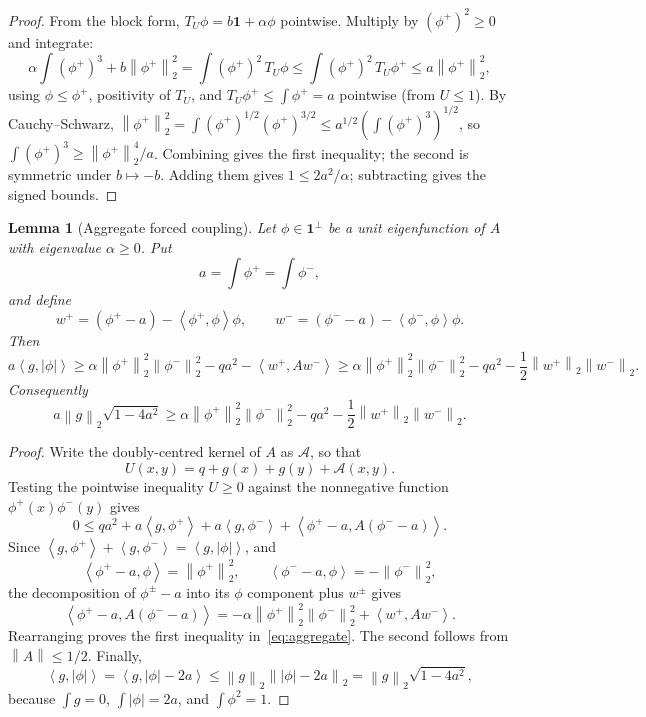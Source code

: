 \documentclass[11pt]{article}
\newtheorem{lemma}[theorem]{Lemma}
\newcommand{\one}{\mathbf 1}
\newcommand{\ip}[2]{\left\langle #1,#2\right\rangle}
\newcommand{\norm}[1]{\left\|#1\right\|}
\begin{document}
\begin{proof}
From the block form, $T_U\phi=b\one+\alpha\phi$ pointwise.  Multiply by
$(\phi^+)^2\ge0$ and integrate:
\[
        \alpha\int(\phi^+)^3+b\norm{\phi^+}_2^2
        =\int(\phi^+)^2\,T_U\phi
        \le\int(\phi^+)^2\,T_U\phi^+
        \le a\norm{\phi^+}_2^2,
\]
using $\phi\le\phi^+$, positivity of $T_U$, and $T_U\phi^+\le\int\phi^+=a$
pointwise (from $U\le1$).  By Cauchy--Schwarz,
$\norm{\phi^+}_2^2=\int(\phi^+)^{1/2}(\phi^+)^{3/2}
\le a^{1/2}(\int(\phi^+)^3)^{1/2}$, so
$\int(\phi^+)^3\ge\norm{\phi^+}_2^4/a$.  Combining gives the first inequality;
the second is symmetric under $b\mapsto-b$.  Adding them gives
$1\le2a^2/\alpha$; subtracting gives the signed bounds.
\end{proof}


\begin{lemma}[Aggregate forced coupling]\label{lem:aggregate}
Let $\phi\in\one^\perp$ be a unit eigenfunction of $A$ with eigenvalue $\alpha\ge0$.  Put
\[
        a=\int\phi^+=\int\phi^-,
\]
and define
\[
        w^+=(\phi^+-a)-\ip{\phi^+}{\phi}\phi,
        \qquad
        w^-=(\phi^--a)-\ip{\phi^-}{\phi}\phi.
\]
Then
\begin{equation}\label{eq:aggregate}
        a\ip{g}{|\phi|}
        \ge
        \alpha\norm{\phi^+}_2^2
        \norm{\phi^-}_2^2
        -qa^2-\ip{w^+}{Aw^-}
        \ge
        \alpha\norm{\phi^+}_2^2
        \norm{\phi^-}_2^2
        -qa^2-\frac12\norm{w^+}_2\norm{w^-}_2.
\end{equation}
Consequently
\begin{equation}\label{eq:aggregate-CS}
        a\norm g_2\sqrt{1-4a^2}
        \ge
        \alpha\norm{\phi^+}_2^2
        \norm{\phi^-}_2^2
        -qa^2-\frac12\norm{w^+}_2\norm{w^-}_2.
\end{equation}
\end{lemma}

\begin{proof}
Write the doubly-centred kernel of $A$ as $\mathcal A$, so that
\[
        U(x,y)=q+g(x)+g(y)+\mathcal A(x,y).
\]
Testing the pointwise inequality $U\ge0$ against the nonnegative function $\phi^+(x)\phi^-(y)$ gives
\[
        0\le q a^2+a\ip{g}{\phi^+}+a\ip{g}{\phi^-}
        +\ip{\phi^+-a}{A(\phi^--a)}.
\]
Since $\ip{g}{\phi^+}+\ip{g}{\phi^-}=\ip{g}{|\phi|}$, and
\[
        \ip{\phi^+-a}{\phi}=\norm{\phi^+}_2^2,
        \qquad
        \ip{\phi^--a}{\phi}=-\norm{\phi^-}_2^2,
\]
the decomposition of $\phi^\pm-a$ into its $\phi$ component plus $w^\pm$ gives
\[
        \ip{\phi^+-a}{A(\phi^--a)}
        =-\alpha\norm{\phi^+}_2^2\norm{\phi^-}_2^2+
        \ip{w^+}{Aw^-}.
\]
Rearranging proves the first inequality in~\eqref{eq:aggregate}.  The second follows from $\norm A\le1/2$.  Finally,
\[
        \ip{g}{|\phi|}=\ip{g}{|\phi|-2a}
        \le\norm g_2\norm{|\phi|-2a}_2
        =\norm g_2\sqrt{1-4a^2},
\]
because $\int g=0$, $\int |\phi|=2a$, and $\int\phi^2=1$.
\end{proof}
\end{document}
